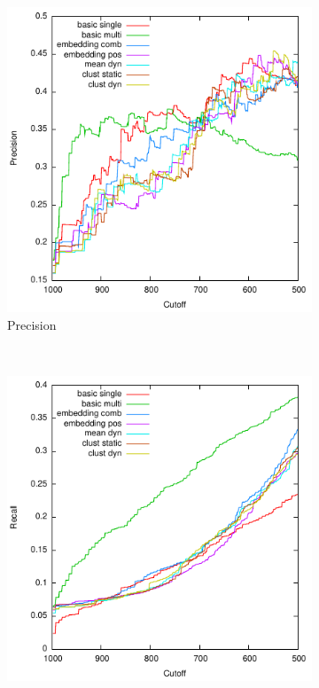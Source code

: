 \documentclass{sig-alternate}
\begin{document}
{{\def \officialRunWidth {0.23\textwidth}
\begin{figure}[tb]
  \centering
    \begin{subfigure}[b]{\officialRunWidth}
            \includegraphics[width=\textwidth]{fig/official/official-prec}
			\caption{Precision}
			\label{official:prec}
    \end{subfigure}
    ~
    \begin{subfigure}[b]{\officialRunWidth}
            \includegraphics[width=\textwidth]{fig/official/official-recall}

\end{subfigure}
\end{figure}}}
\end{document}
